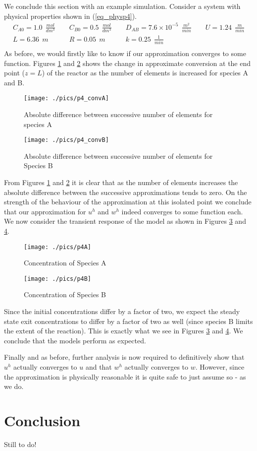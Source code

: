 \documentclass[11pt,fleqn]{article}
\theoremstyle{defstyle}
\begin{document}
We conclude this section with an example simulation. Consider a system with physical properties shown in (\ref{eq_physp4}).
\begin{equation}
\begin{matrix}
C_{A0} = 1.0 ~~ \frac{mol}{dm^3}& \phantom{-}C_{B0} = 0.5~~ \frac{mol}{dm^3} & \phantom{-}D_{AB} = 7.6\times 10^{-5} ~~\frac{m^2}{min} & \phantom{-}U = 1.24~~ \frac{m}{min} \\
L = 6.36~~ m 
& \phantom{-} R = 0.05~~ m
& \phantom{-} k = 0.25 ~~ \frac{1}{min} \\
\end{matrix} 
\label{eq_physp4}
\end{equation}
As before, we would firstly like to know if our approximation converges to some function. Figures \ref{fig_p4convA} and \ref{fig_p4convB} shows the change in approximate conversion at the end point ($z=L$) of the reactor as the number of elements is increased for species A and B.
\begin{figure}[H] 
\centering
\texttt{[image: ./pics/p4\_convA]}
\caption{Absolute difference between successive number of elements for species A} 
\label{fig_p4convA}
\end{figure}
\begin{figure}[H] 
\centering
\texttt{[image: ./pics/p4\_convB]}
\caption{Absolute difference between successive number of elements for Species B} 
\label{fig_p4convB}
\end{figure}
From Figures \ref{fig_p4convA} and \ref{fig_p4convB} it is clear that as the number of elements increases the absolute difference between the successive approximations tends to zero. On the strength of the behaviour of the approximation at this isolated point we conclude that our approximation for $u^h$ and $w^h$ indeed converges to some function each. We now consider the transient response of the model as shown in Figures \ref{fig_p4A} and \ref{fig_p4B}.
\begin{figure}[H] 
\centering
\texttt{[image: ./pics/p4A]}
\caption{Concentration of Species A} 
\label{fig_p4A}
\end{figure}
\begin{figure}[H] 
\centering
\texttt{[image: ./pics/p4B]}
\caption{Concentration of Species B} 
\label{fig_p4B}
\end{figure}
Since the initial concentrations differ by a factor of two, we expect the steady state exit concentrations to differ by a factor of two as well (since species B limits the extent of the reaction). This is exactly what we see in Figures \ref{fig_p4A} and \ref{fig_p4B}. We conclude that the models perform as expected.

Finally and as before, further analysis is now required to definitively show that $u^h$ actually converges to $u$ and that $w^h$ actually converges to $w$. However, since the approximation is physically reasonable it is quite safe to just assume so - as we do.

\section{Conclusion}
Still to do!

\newpage


\end{document}
